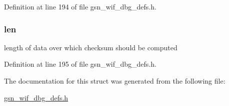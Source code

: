 Definition at line 194 of file gsn\_\-wif\_\-dbg\_\-defs.h.

\hypertarget{a00327_ab9abc6ede61238a05664f9c37e4412c3}{
\subsubsection[{len}]{ {\bf len}}}
\label{a00327_ab9abc6ede61238a05664f9c37e4412c3}
length of data over which checksum should be computed 

Definition at line 195 of file gsn\_\-wif\_\-dbg\_\-defs.h.



The documentation for this struct was generated from the following file:\begin{DoxyCompactItemize}
\item 
\hyperlink{a00609}{gsn\_\-wif\_\-dbg\_\-defs.h}\end{DoxyCompactItemize}
